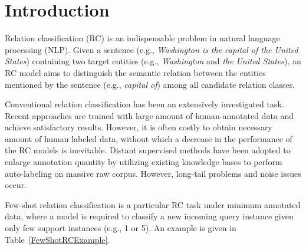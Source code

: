 \section{Introduction}
Relation classification (RC) is an indispensable problem in natural language processing (NLP). Given a sentence (e.g., \emph{Washington is the capital of the United States}) containing two target entities (e.g., \emph{Washington} and \emph{the United States}), an RC model aims to distinguish the semantic relation between the entities mentioned by the sentence (e.g., \emph{capital of}) among all candidate relation classes.

Conventional relation classification has been an extensively investigated task.
Recent approaches \cite{zeng-etal-2014-relation,RNNRC,vu-etal-2016-combining} are trained with large amount of human-annotated data and achieve satisfactory results.
However, it is often costly to obtain necessary amount of human labeled data,
without which a decrease in the performance of the RC models is inevitable.
Distant supervised  methods \cite{NYTdataset} have been adopted to enlarge annotation quantity by utilizing existing knowledge bases to perform auto-labeling on massive raw corpus. However, long-tail problems \cite{xiong-etal-2018-one,han-etal-2018-fewrel,ye-ling-2019-multi} and noise issues occur.

Few-shot relation classification is a particular RC task under minimum annotated data, where a model is required to classify a new incoming query instance given only few support instances (e.g., 1 or 5). An example is given in Table~\ref{FewShotRCExample}.

